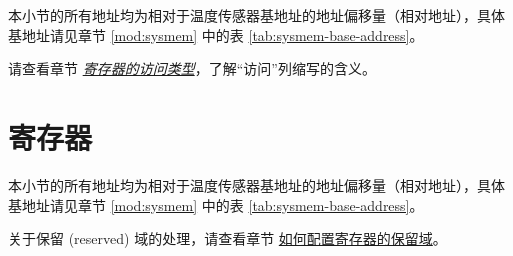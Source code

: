 \documentclass[main\_\_CN.tex]{subfiles}
\begin{document}
本小节的所有地址均为相对于温度传感器基地址的地址偏移量（相对地址），具体基地址请见章节 \ref{mod:sysmem} \textit{} 中的表 \ref{tab:sysmem-base-address}。

请查看章节 \hyperref[glossary-access-types]{\textit{寄存器的访问类型}}，了解“访问”列缩写的含义。






\newpage
\section{寄存器}

本小节的所有地址均为相对于温度传感器基地址的地址偏移量（相对地址），具体基地址请见章节 \ref{mod:sysmem} \textit{} 中的表 \ref{tab:sysmem-base-address}。

关于保留 (reserved) 域的处理，请查看章节 \hyperref[programming-reserved-field]{如何配置寄存器的保留域}。


\end{document}
